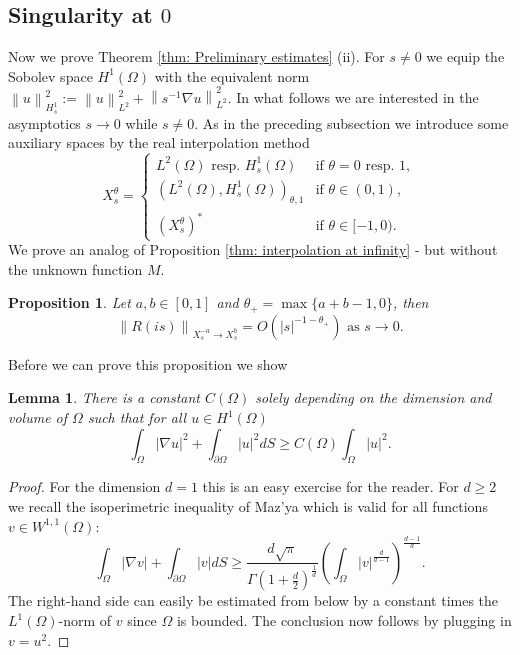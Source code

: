 \documentclass{amsart}
\newcommand{\abs}[1]{\left|#1\right|}
\newcommand{\norm}[1]{\left\| #1 \right\|}
\newtheorem{Proposition}[Theorem]{Proposition}
\newtheorem{Lemma}[Theorem]{Lemma}
\begin{document}
\subsection{Singularity at $0$}
Now we prove Theorem \ref{thm: Preliminary estimates} (ii). For $s\neq 0$ we equip the Sobolev space $H^1(\Omega)$ with the equivalent norm $\norm{u}_{H_s^1}^2:=\norm{u}_{L^2}^2+\norm{s^{-1}\nabla u}_{L^2}^2$. In what follows we are interested in the asymptotics $s\rightarrow0$ while $s\neq0$. As in the preceding subsection we introduce some auxiliary spaces by the real interpolation method
\begin{equation}\nonumber
 X^{\theta}_s =
 \begin{cases}
  L^2(\Omega) \text{ resp. } H^1_s(\Omega) & \text{if } \theta = 0 \text{ resp. } 1, \\
  (L^2(\Omega), H^1_s(\Omega))_{\theta, 1} & \text{if } \theta\in(0,1), \\
  (X^{\theta}_s)^* & \text{if } \theta\in[-1, 0).
 \end{cases}
\end{equation}
We prove an analog of Proposition \ref{thm: interpolation at infinity} - but without the unknown function $M$.
\begin{Proposition}\label{thm: interpolation at 0}
 Let $a, b\in [0,1]$ and $\theta_+=\max\{a+b-1, 0\}$, then
 \begin{equation}\label{eq: interpolation at 0}
  \norm{R(is)}_{X^{-a}_s\rightarrow X^{b}_s} = O(\abs{s}^{-1-\theta_+}) \text{ as } s\rightarrow 0 .
 \end{equation}
\end{Proposition}
Before we can prove this proposition we show
\begin{Lemma}\label{thm: Maz'ya}
 There is a constant $C(\Omega)$ solely depending on the dimension and volume of $\Omega$ such that for all $u\in H^1(\Omega)$
 \begin{equation}\nonumber
  \int_{\Omega} \abs{\nabla u}^2 + \int_{\partial\Omega} \abs{u}^2 dS \geq C(\Omega) \int_{\Omega} \abs{u}^2 .
 \end{equation}
\end{Lemma}
\begin{proof}
 For the dimension $d=1$ this is an easy exercise for the reader. For $d\geq2$ we recall the isoperimetric inequality of Maz'ya \cite[Chapter 5.6]{Maz'ya} which is valid for all functions $v\in W^{1,1}(\Omega)$:
 \begin{equation}\nonumber
    \int_{\Omega} \abs{\nabla v} + \int_{\partial\Omega} \abs{v} dS 
    \geq \frac{d\sqrt{\pi}}{\Gamma(1+\frac{d}{2})^{\frac{1}{d}}} \left(\int_{\Omega} \abs{v}^{\frac{d}{d-1}}\right)^{\frac{d-1}{d}} .
 \end{equation}
 The right-hand side can easily be estimated from below by a constant times the $L^1(\Omega)$-norm of $v$ since $\Omega$ is bounded. The conclusion now follows by plugging in $v=u^2$.
\end{proof}
\end{document}
